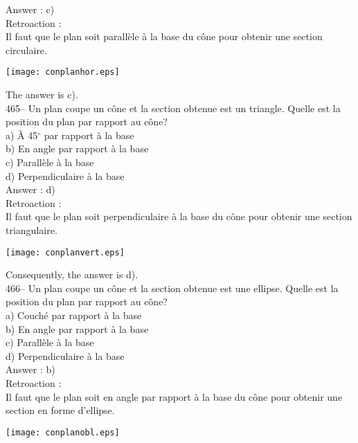 ﻿\documentclass[letterpaper, 12pt]{article}
\begin{document}
Answer : c)\\

Retroaction : \\
Il faut que le plan soit parall\`ele \`a la base du c\^one pour
obtenir une section circulaire.
    \begin{center}
    \texttt{[image: conplanhor.eps]}
    \end{center}

The answer is c).\\

465-- Un plan coupe un c\^one et la section obtenue est un triangle.  Quelle
est la position du plan par rapport au c\^one?\\
a) \`A 45$^{\circ}$ par rapport \`a la base\\
b) En angle par rapport \`a la base\\
c) Parall\`ele \`a la base\\
d) Perpendiculaire \`a la base\\

Answer : d)\\

Retroaction : \\
Il faut que le plan soit perpendiculaire \`a la base du c\^one pour
obtenir une section triangulaire.
    \begin{center}
    \texttt{[image: conplanvert.eps]}
    \end{center}

Consequently, the answer is d).\\


466-- Un plan coupe un c\^one et la section obtenue est une ellipse.  Quelle
est la position du plan par rapport au c\^one?\\
a) Couch\'e par rapport \`a la base\\
b) En angle par rapport \`a la base\\
c) Parall\`ele \`a la base\\
d) Perpendiculaire \`a la base\\

Answer : b)\\

Retroaction : \\
Il faut que le plan soit en angle par rapport \`a la base du c\^one
pour obtenir une section en forme d'ellipse.
    \begin{center}
    \texttt{[image: conplanobl.eps]}
    \end{center}
\end{document}
